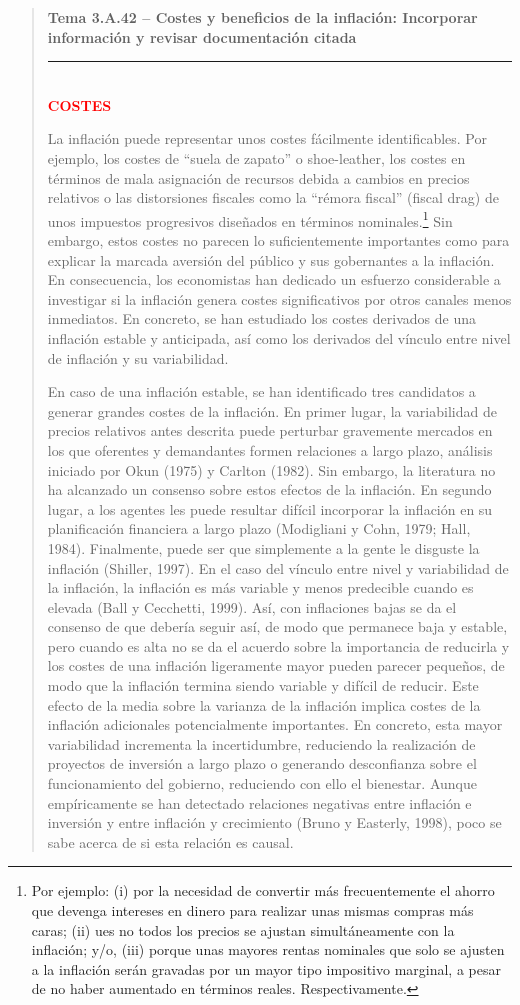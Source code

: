 \documentclass[10pt,a4paper]{article}
\newenvironment{specialblock}[1]{%
      \begin{quote} %
      \small %
      \noindent\textbf{#1}\\[-0.3em] %
      \rule{\linewidth}{0.4pt}\\[0.6em]}{
      \end{quote}}
\begin{document}
\begin{specialblock}{\textbf{Tema 3.A.42} -- Costes y beneficios de la inflación: Incorporar información y revisar documentación citada}
    \textcolor{red}{\textbf{COSTES}}

    La inflación puede representar unos costes fácilmente identificables. Por ejemplo, los costes de “suela de zapato” o shoe-leather, los costes en términos de mala asignación de recursos debida a cambios en precios relativos o las distorsiones fiscales como la “rémora fiscal” (fiscal drag) de unos impuestos progresivos diseñados en términos nominales.\footnote{
    Por ejemplo: (i) por la necesidad de convertir más frecuentemente el ahorro que devenga intereses en dinero para realizar unas mismas compras más caras; (ii) ues no todos los precios se ajustan simultáneamente con la inflación; y/o, (iii) porque unas mayores rentas nominales que solo se ajusten a la inflación serán gravadas por un mayor tipo impositivo marginal, a pesar de no haber aumentado en términos reales. Respectivamente.
    } Sin embargo, estos costes no parecen lo suficientemente importantes como para explicar la marcada aversión del público y sus gobernantes a la inflación. En consecuencia, los economistas han dedicado un esfuerzo considerable a investigar si la inflación genera costes significativos por otros canales menos inmediatos. En concreto, se han estudiado los costes derivados de una inflación estable y anticipada, así como los derivados del vínculo entre nivel de inflación y su variabilidad.

    En caso de una inflación estable, se han identificado tres candidatos a generar grandes costes de la inflación. En primer lugar, la variabilidad de precios relativos antes descrita puede perturbar gravemente mercados en los que oferentes y demandantes formen relaciones a largo plazo, análisis iniciado por Okun (1975) y Carlton (1982). Sin embargo, la literatura no ha alcanzado un consenso sobre estos efectos de la inflación. En segundo lugar, a los agentes les puede resultar difícil incorporar la inflación en su planificación financiera a largo plazo (Modigliani y Cohn, 1979; Hall, 1984). Finalmente, puede ser que simplemente a la gente le disguste la inflación (Shiller, 1997). En el caso del vínculo entre nivel y variabilidad de la inflación, la inflación es más variable y menos predecible cuando es elevada (Ball y Cecchetti, 1999). Así, con inflaciones bajas se da el consenso de que debería seguir así, de modo que permanece baja y estable, pero cuando es alta no se da el acuerdo sobre la importancia de reducirla y los costes de una inflación ligeramente mayor pueden parecer pequeños, de modo que la inflación termina siendo variable y difícil de reducir. Este efecto de la media sobre la varianza de la inflación implica costes de la inflación adicionales potencialmente importantes. En concreto, esta mayor variabilidad incrementa la incertidumbre, reduciendo la realización de proyectos de inversión a largo plazo o generando desconfianza sobre el funcionamiento del gobierno, reduciendo con ello el bienestar. Aunque empíricamente se han detectado relaciones negativas entre inflación e inversión y entre inflación y crecimiento (Bruno y Easterly, 1998), poco se sabe acerca de si esta relación es causal.


\end{specialblock}
\end{document}
